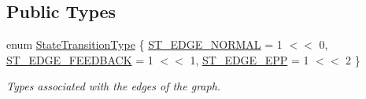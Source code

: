 \subsection*{Public Types}
\begin{DoxyCompactItemize}
\item 
enum \hyperlink{classTransitionInfo_a5a56ae15f29949e7b9947f1134e6d7e8}{State\+Transition\+Type} \{ \hyperlink{classTransitionInfo_a5a56ae15f29949e7b9947f1134e6d7e8a99d81cb719d2510a48daea589fa00803}{S\+T\+\_\+\+E\+D\+G\+E\+\_\+\+N\+O\+R\+M\+AL} = 1 $<$$<$ 0, 
\hyperlink{classTransitionInfo_a5a56ae15f29949e7b9947f1134e6d7e8a293c0d38e9bbbfe4a88da0309282673a}{S\+T\+\_\+\+E\+D\+G\+E\+\_\+\+F\+E\+E\+D\+B\+A\+CK} = 1 $<$$<$ 1, 
\hyperlink{classTransitionInfo_a5a56ae15f29949e7b9947f1134e6d7e8af7925feee9c3e47cbce561be72e3e11b}{S\+T\+\_\+\+E\+D\+G\+E\+\_\+\+E\+PP} = 1 $<$$<$ 2
 \}\begin{DoxyCompactList}\small\item\em Types associated with the edges of the graph. \end{DoxyCompactList}
\end{DoxyCompactItemize}
